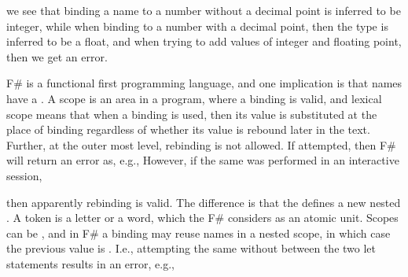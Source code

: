 




%
we see that binding a name to a number without a decimal point is inferred to be integer, while when binding to a number with a decimal point, then the type is inferred to be a float, and when trying to add values of integer and floating point, then we get an error.

F\# is a functional first programming language, and one implication is that names have a . A scope is an area in a program, where a binding is valid, and lexical scope means that when a binding is used, then its value is substituted at the place of binding regardless of whether its value is rebound later in the text. Further, at the outer most level, rebinding is not allowed. If attempted, then F\# will return an error as, e.g., 
%
%
However, if the same was performed in an interactive session,
%



%
then apparently rebinding is valid. The difference is that the \idx{\token{;;}}  defines a new nested . A token is a letter or a word, which the F\# considers as an atomic unit. Scopes can be , and in F\# a binding may reuse names in a nested scope, in which case the previous value is . I.e., attempting the same without \token{;;} between the two let statements results in an error, e.g.,
%

